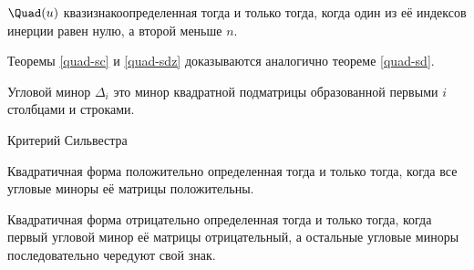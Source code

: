 \begin{theorem}\label{quad-sdz}
  \(\Quad(u)\) квазизнакоопределенная тогда и только тогда, когда один из её
  индексов инерции равен нулю, а второй меньше \(n\).
\end{theorem}

\begin{remark}
  Теоремы \ref{quad-sc} и \ref{quad-sdz} доказываются аналогично теореме
  \ref{quad-sd}.
\end{remark}

\begin{definition}
  Угловой минор \(\Delta_{i}\) это минор квадратной подматрицы образованной
  первыми \(i\) столбцами и строками.
\end{definition}

\begin{theorem}
  Критерий Сильвестра

  Квадратичная форма положительно определенная тогда и только тогда, когда все
  угловые миноры её матрицы положительны.

  Квадратичная форма отрицательно определенная тогда и только тогда, когда
  первый угловой минор её матрицы отрицательный, а остальные угловые миноры
  последовательно чередуют свой знак.
\end{theorem}
